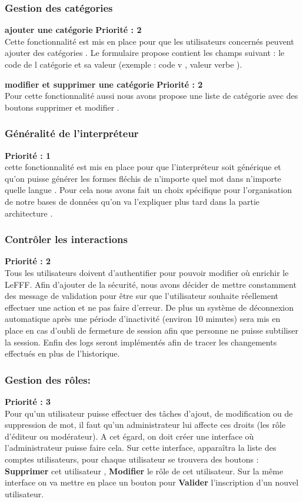 \documentclass[12pt,a4paper]{article}
\begin{document}
 
\subsubsection{Gestion des catégories }
\textbf{ajouter une catégorie } \textbf{Priorité : 2}\\ Cette fonctionnalité  est mis en place pour que les utilisateurs concernés peuvent ajouter des catégories . Le formulaire propose contient les champs suivant : le code de l catégorie et sa valeur (exemple : code v , valeur verbe ).

\textbf{modifier et supprimer  une catégorie } \textbf{Priorité : 2}\\ Pour cette fonctionnalité aussi nous avons propose une liste de catégorie avec des boutons supprimer et modifier .
\subsubsection{Généralité de l'interpréteur} \textbf{Priorité : 1}\\ cette fonctionnalité est mis en place pour que l'interpréteur soit générique et qu'on puisse générer les formes fléchis de n'importe quel mot dans n'importe quelle langue . Pour cela nous avons fait un choix spécifique pour l'organisation de notre bases de données qu'on va l'expliquer plus tard dans la partie architecture .

\subsubsection{Contrôler les interactions }
 \textbf{Priorité : 2}
\\ Tous les utilisateurs doivent d'authentifier pour pouvoir modifier où enrichir le LeFFF. Afin d'ajouter de la sécurité, nous avons décider de mettre constamment des message de validation pour être sur que l'utilisateur souhaite réellement effectuer une action et ne pas faire d'erreur.
De plus un système de déconnexion automatique après une période d'inactivité (environ 10 minutes) sera mis en place en cas d'oubli de fermeture de session afin que personne ne puisse subtiliser la session.
Enfin des logs seront implémentés afin de tracer les changements effectués en plus de l'historique.

\subsubsection{Gestion des rôles:}
 \textbf{Priorité : 3} \\
Pour qu'un utilisateur puisse effectuer des tâches d'ajout, de modification ou de suppression de mot, il faut qu'un administrateur lui affecte ces droits (les rôle d'éditeur ou modérateur). A cet égard, on doit créer une interface où l'administrateur puisse faire cela.
Sur cette interface, apparaîtra la liste des comptes utilisateurs, pour chaque utilisateur se trouvera des boutons  : \textbf{Supprimer} cet utilisateur ,\textbf{ Modifier} le rôle de cet utilisateur. 
Sur la même interface on va mettre en place un bouton pour \textbf{Valider} l'inscription d'un nouvel utilisateur.
\end{document}
